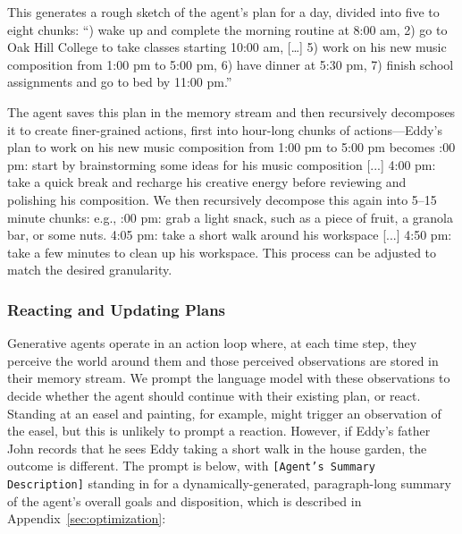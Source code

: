 \begin{quote}

\end{quote}

This generates a rough sketch of the agent's plan for a day, divided into five to eight chunks: “{\color{darkgray}\small\fontfamily{}) wake up and complete the morning routine at 8:00 am, 2) go to Oak Hill College to take classes starting 10:00 am, […] 5) work on his new music composition from 1:00 pm to 5:00 pm, 6) have dinner at 5:30 pm, 7) finish school assignments and go to bed by 11:00 pm.}” 

The agent saves this plan in the memory stream and then recursively decomposes it to create finer-grained actions, first into hour-long chunks of actions---Eddy’s plan to {\color{darkgray}\small\fontfamily{}\selectfont
work on his new music composition from 1:00 pm to 5:00 pm} becomes {\color{darkgray}\small\fontfamily{}:00 pm: start by brainstorming some ideas for his music composition [...] 4:00 pm: take a quick break and recharge his creative energy before reviewing and polishing his composition}. We then recursively decompose this again into 5--15 minute chunks: e.g., {\color{darkgray}\small\fontfamily{}:00 pm: grab a light snack, such as a piece of fruit, a granola bar, or some nuts. 4:05 pm: take a short walk around his workspace [...] 4:50 pm: take a few minutes to clean up his workspace}. This process can be adjusted to match the desired granularity. 

\subsubsection{Reacting and Updating Plans} Generative agents operate in an action loop where, at each time step, they perceive the world around them and those perceived observations are stored in their memory stream. We prompt the language model with these observations to decide whether the agent should continue with their existing plan, or react. Standing at an easel and painting, for example, might trigger an observation of the easel, but this is unlikely to prompt a reaction. However, if Eddy's father John records that he sees Eddy taking a short walk in the house garden, the outcome is different. The prompt is below, with \texttt{[Agent's Summary Description]} standing in for a dynamically-generated, paragraph-long summary of the agent's overall goals and disposition, which is described in Appendix~\ref{sec:optimization}:

